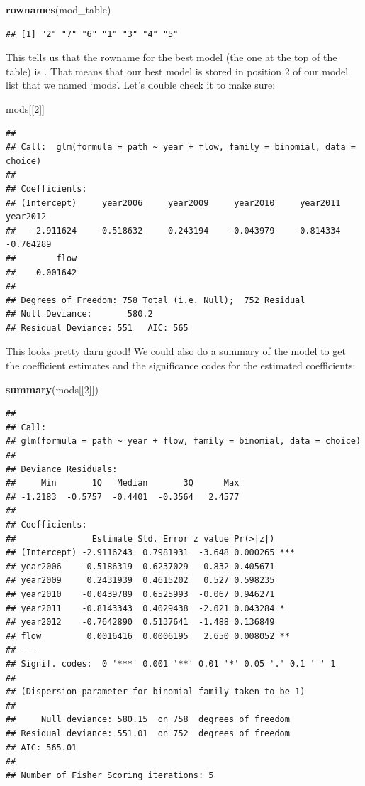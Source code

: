 \documentclass[
]{book}
\newenvironment{Shaded}{\begin{snugshade}}{\end{snugshade}}
\newcommand{\DecValTok}[1]{\textcolor[rgb]{0.00,0.00,0.81}{#1}}
\newcommand{\KeywordTok}[1]{\textcolor[rgb]{0.13,0.29,0.53}{\textbf{#1}}}
\newcommand{\NormalTok}[1]{#1}
\begin{document}
\begin{Shaded}
\begin{Highlighting}[]
\KeywordTok{rownames}\NormalTok{(mod_table)}
\end{Highlighting}
\end{Shaded}

\begin{verbatim}
## [1] "2" "7" "6" "1" "3" "4" "5"
\end{verbatim}

This tells us that the rowname for the best model (the one at the top of the table) is . That means that our best model is stored in position 2 of our model list that we named `mods'. Let's double check it to make sure:

\begin{Shaded}
\begin{Highlighting}[]
\NormalTok{mods[[}\DecValTok{2}\NormalTok{]]}
\end{Highlighting}
\end{Shaded}

\begin{verbatim}
## 
## Call:  glm(formula = path ~ year + flow, family = binomial, data = choice)
## 
## Coefficients:
## (Intercept)     year2006     year2009     year2010     year2011     year2012  
##   -2.911624    -0.518632     0.243194    -0.043979    -0.814334    -0.764289  
##        flow  
##    0.001642  
## 
## Degrees of Freedom: 758 Total (i.e. Null);  752 Residual
## Null Deviance:	    580.2 
## Residual Deviance: 551 	AIC: 565
\end{verbatim}

This looks pretty darn good! We could also do a summary of the model to get the coefficient estimates and the significance codes for the estimated coefficients:

\begin{Shaded}
\begin{Highlighting}[]
\KeywordTok{summary}\NormalTok{(mods[[}\DecValTok{2}\NormalTok{]])}
\end{Highlighting}
\end{Shaded}

\begin{verbatim}
## 
## Call:
## glm(formula = path ~ year + flow, family = binomial, data = choice)
## 
## Deviance Residuals: 
##     Min       1Q   Median       3Q      Max  
## -1.2183  -0.5757  -0.4401  -0.3564   2.4577  
## 
## Coefficients:
##               Estimate Std. Error z value Pr(>|z|)    
## (Intercept) -2.9116243  0.7981931  -3.648 0.000265 ***
## year2006    -0.5186319  0.6237029  -0.832 0.405671    
## year2009     0.2431939  0.4615202   0.527 0.598235    
## year2010    -0.0439789  0.6525993  -0.067 0.946271    
## year2011    -0.8143343  0.4029438  -2.021 0.043284 *  
## year2012    -0.7642890  0.5137641  -1.488 0.136849    
## flow         0.0016416  0.0006195   2.650 0.008052 ** 
## ---
## Signif. codes:  0 '***' 0.001 '**' 0.01 '*' 0.05 '.' 0.1 ' ' 1
## 
## (Dispersion parameter for binomial family taken to be 1)
## 
##     Null deviance: 580.15  on 758  degrees of freedom
## Residual deviance: 551.01  on 752  degrees of freedom
## AIC: 565.01
## 
## Number of Fisher Scoring iterations: 5
\end{verbatim}
\end{document}
